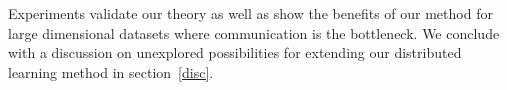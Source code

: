 Experiments validate our theory as well as show the benefits of our method for large dimensional datasets where communication is the bottleneck. We conclude with a discussion on unexplored possibilities for extending our distributed learning method in section~\ref{disc}.



